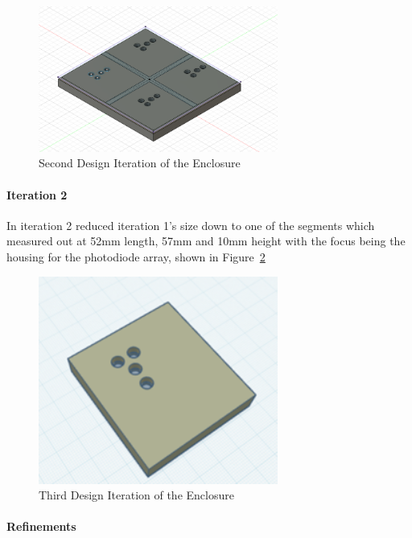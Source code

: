 \begin{figure}[htbp]
    \centering
    \includegraphics[width=0.7\textwidth]{figures/CAD-3DPrint/2ndIteration.png}
    \caption{Second Design Iteration of the Enclosure}
    \label{fig:CAD2}
\end{figure}

\paragraph{Iteration 2}

In iteration 2 reduced iteration 1's size down to one of the segments which measured out at 52mm length, 57mm and 10mm height with the focus being the housing for the photodiode array, shown in Figure~\ref{fig:CAD3}

\begin{figure}[htbp]
    \centering
    \includegraphics[width=0.7\textwidth]{figures/CAD-3DPrint/3rdIteration.png}
    \caption{Third Design Iteration of the Enclosure}
    \label{fig:CAD3}
\end{figure}

\paragraph{Refinements}


